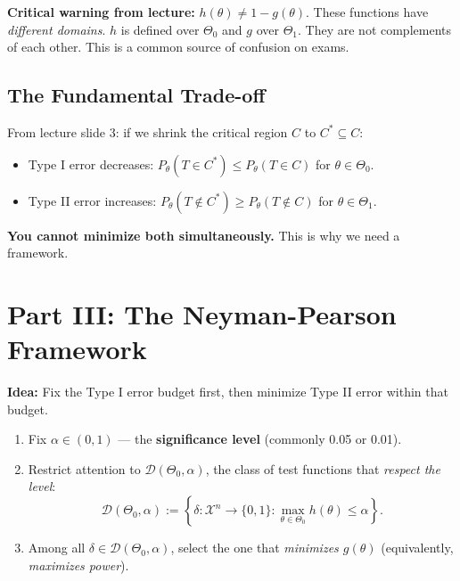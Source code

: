 \documentclass[11pt,a4paper]{article}
\begin{document}
\begin{tcolorbox}[dangerbox]
\textbf{Critical warning from lecture:} $h(\theta) \neq 1-g(\theta)$. These functions have \emph{different domains}. $h$ is defined over $\Theta_0$ and $g$ over $\Theta_1$. They are not complements of each other. This is a common source of confusion on exams.
\end{tcolorbox}

\subsection{The Fundamental Trade-off}

From lecture slide 3: if we shrink the critical region $C$ to $C^* \subseteq C$:
\begin{itemize}
  \item Type I error decreases: $P_\theta(T\in C^*) \leq P_\theta(T\in C)$ for $\theta\in\Theta_0$.
  \item Type II error increases: $P_\theta(T\notin C^*) \geq P_\theta(T\notin C)$ for $\theta\in\Theta_1$.
\end{itemize}
\textbf{You cannot minimize both simultaneously.} This is why we need a framework.

\section{Part III: The Neyman-Pearson Framework}

\begin{tcolorbox}[thmbox, title={Neyman-Pearson Framework (Lecture slide 4)}]
\textbf{Idea:} Fix the Type I error budget first, then minimize Type II error within that budget.

\begin{enumerate}[leftmargin=2em]
  \item Fix $\alpha \in (0,1)$ --- the \textbf{significance level} (commonly 0.05 or 0.01).
  \item Restrict attention to $\mathcal{D}(\Theta_0,\alpha)$, the class of test functions that \emph{respect the level}:
  \[
    \mathcal{D}(\Theta_0,\alpha) := \left\{\delta : \mathcal{X}^n\to\{0,1\} : \max_{\theta\in\Theta_0} h(\theta) \leq \alpha\right\}.
  \]
  \item Among all $\delta\in\mathcal{D}(\Theta_0,\alpha)$, select the one that \emph{minimizes $g(\theta)$} (equivalently, \emph{maximizes power}).
\end{enumerate}
\end{tcolorbox}
\end{document}
